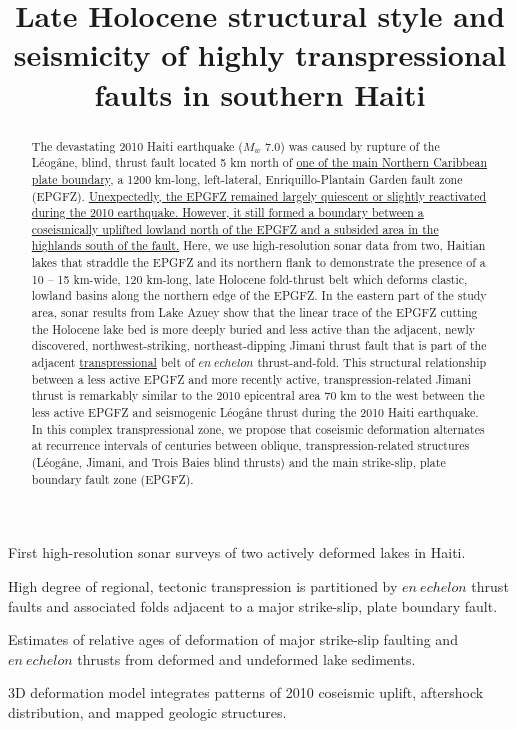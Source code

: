 \documentclass[linenumbers,draft]{agujournal}
\begin{document}
\title{Late Holocene structural style and seismicity of highly transpressional faults in southern Haiti}



\begin{keypoints}
\item First high-resolution sonar surveys of two actively deformed lakes in Haiti.
\item High degree of regional, tectonic transpression is partitioned by $en~echelon$ thrust faults and associated folds adjacent to a major strike-slip, plate boundary fault.
\item Estimates of relative ages of deformation of major strike-slip faulting and $en~echelon$ thrusts from deformed and undeformed lake sediments.
\item 3D deformation model integrates patterns of 2010 coseismic uplift, aftershock distribution, and mapped geologic structures.
\end{keypoints}

\begin{abstract}
The devastating 2010 Haiti earthquake ($M_w$ 7.0) was caused by rupture of the L\'eog\^ane, blind, thrust fault located 5 km north of \ul{one of the main Northern Caribbean plate boundary}, a 1200 km-long, left-lateral, Enriquillo-Plantain Garden fault zone (EPGFZ). \ul{Unexpectedly, the EPGFZ remained largely quiescent or slightly reactivated during the 2010 earthquake. However, it still formed a boundary between a coseismically uplifted lowland north of the EPGFZ and a subsided area in the highlands south of the fault.} Here, we use high-resolution sonar data from two, Haitian lakes that straddle the EPGFZ and its northern flank to demonstrate the presence of a 10 -- 15 km-wide, 120 km-long, late Holocene fold-thrust belt which deforms clastic, lowland basins along the northern edge of the EPGFZ. In the eastern part of the study area, sonar results from Lake Azuey show that the linear trace of the EPGFZ cutting the Holocene lake bed is more deeply buried and less active than the adjacent, newly discovered, northwest-striking, northeast-dipping Jimani thrust fault that is part of the adjacent \ul{transpressional} belt of $en~echelon$ thrust-and-fold. This structural relationship between a less active EPGFZ and more recently active, transpression-related Jimani thrust is remarkably similar to the 2010 epicentral area 70 km to the west between the less active EPGFZ and seismogenic L\'eog\^ane thrust during the 2010 Haiti earthquake. In this complex transpressional zone, we propose that coseismic deformation alternates at recurrence intervals of centuries between oblique, transpression-related structures (L\'eog\^ane, Jimani, and Trois Baies blind thrusts) and the main strike-slip, plate boundary fault zone (EPGFZ).
\end{abstract}
\end{document}
